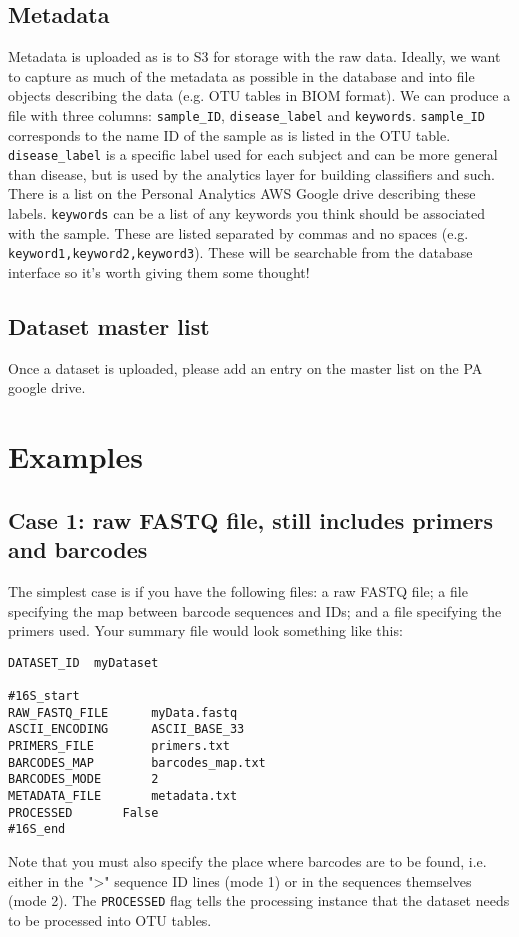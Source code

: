 \documentclass[11pt, oneside]{article}   	%
\begin{document}
\subsection{Metadata}
Metadata is uploaded as is to S3 for storage with the raw data.  Ideally, we want to capture as much of the metadata as possible in the database and into file objects describing the data (e.g. OTU tables in BIOM format).  We can produce a file with three columns: {\tt sample\_ID}, {\tt disease\_label} and {\tt keywords}.  {\tt sample\_ID} corresponds to the name ID of the sample as is listed in the OTU table.  {\tt disease\_label} is a specific label used for each subject and can be more general than disease, but is used by the analytics layer for building classifiers and such.  There is a list on the Personal Analytics AWS Google drive describing these labels.  {\tt keywords} can be a list of any keywords you think should be associated with the sample.  These are listed separated by commas and no spaces (e.g. {\tt keyword1,keyword2,keyword3}).  These will be searchable from the database interface so it's worth giving them some thought!

\subsection{Dataset master list}
Once a dataset is uploaded, please add an entry on the master list on the PA google drive.

\section{Examples}
\subsection{Case 1: raw FASTQ file, still includes primers and barcodes}
The simplest case is if you have the following files: a raw FASTQ file; a file specifying the map between barcode sequences and IDs; and a file specifying the primers used.  Your summary file would look something like this:

\begin{verbatim}
DATASET_ID	myDataset

#16S_start
RAW_FASTQ_FILE		myData.fastq
ASCII_ENCODING		ASCII_BASE_33
PRIMERS_FILE		primers.txt
BARCODES_MAP		barcodes_map.txt
BARCODES_MODE		2
METADATA_FILE		metadata.txt
PROCESSED		False
#16S_end
\end{verbatim}
Note that you must also specify the place where barcodes are to be found, i.e. either in the ">" sequence ID lines (mode 1) or in the sequences themselves (mode 2).  The {\tt PROCESSED} flag tells the processing instance that the dataset needs to be processed into OTU tables.
\end{document}
